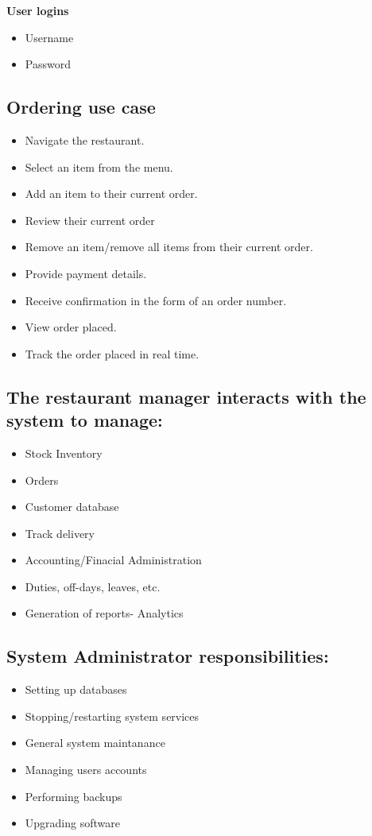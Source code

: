 \documentclass[11pt]{article}
\begin{document}
\textbf{\Large User logins}
\begin{itemize}
 \item Username
 \item Password
\end{itemize}

\subsection{\Large Ordering use case}
\begin{itemize}
 \item Navigate the restaurant.
 \item Select an item from the menu.
 \item Add an item to their current order.
 \item Review their current order
 \item Remove an item/remove all items from their current order.
 \item Provide payment details.
 \item Receive confirmation in the form of an order number.
 \item View order placed.
 \item Track the order placed in real time.
\end{itemize} 

\subsection{\Large The restaurant manager interacts with the system to manage:}

\begin {itemize}
 \item Stock Inventory 
 \item Orders
 \item Customer database 
 \item Track delivery
 \item Accounting/Finacial Administration 
 \item Duties, off-days, leaves, etc.
 \item Generation of reports- Analytics
\end{itemize} 

\subsection{\Large System Administrator responsibilities:}
\begin {itemize}
  \item Setting up databases 
  \item Stopping/restarting system services
  \item General system maintanance
  \item Managing users accounts
  \item Performing backups
  \item Upgrading software
\end{itemize}
\end{document}
